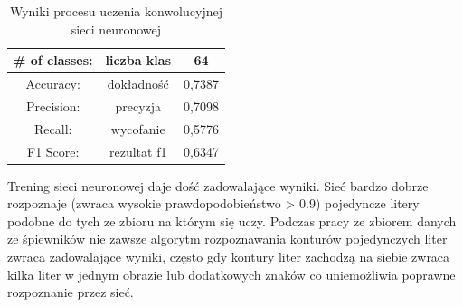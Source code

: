 \documentclass[a4paper,12pt]{article}
\newcommand\spacingInSolemnItemize{1.2}
\begin{document}
            
            \begin{table}[h!]
            \centering
                \begin{tabular}{|c| c| c|} 
                 \hline
                 \# of classes: & liczba klas & 64\\  \hline
                 Accuracy: & dokładność & 0,7387\\ \hline
                 Precision: & precyzja & 0,7098\\ \hline
                 Recall: & wycofanie & 0,5776\\ \hline
                 F1 Score: & rezultat f1 & 0,6347\\ \hline
                \end{tabular}
                \caption{Wyniki procesu uczenia konwolucyjnej sieci neuronowej}
                \label{table:02}
            \end{table}
            
             Trening sieci neuronowej daje dość zadowalające wyniki. Sieć bardzo dobrze rozpoznaje (zwraca wysokie prawdopodobieństwo > 0.9) pojedyncze litery podobne do tych ze zbioru na którym się uczy. Podczas pracy ze zbiorem danych ze śpiewników nie zawsze algorytm rozpoznawania konturów pojedynczych liter zwraca zadowalające wyniki, często gdy kontury liter zachodzą na siebie zwraca kilka liter w jednym obrazie lub dodatkowych znaków co uniemożliwia poprawne rozpoznanie przez sieć. 
\end{document}
